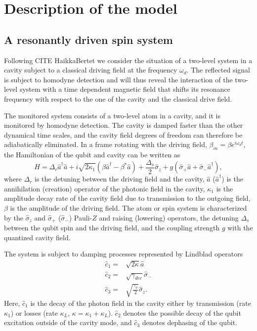 \documentclass[aps,pra,twocolumn,groupedaddress,showpacs]{revtex4}
\begin{document}
\section{Description of the model}

\subsection{A resonantly driven spin system}

Following CITE HaikkaBertet we consider the situation of a two-level system in a cavity subject to a classical driving field at the frequency $\omega_d$. The reflected signal is subject to homodyne detection and will thus reveal the interaction of the two-level system with a time dependent magnetic field that shifts its resonance frequency with respect to the one of the cavity and the classical drive field.   

The monitored system consists of a two-level atom in a cavity, and it is monitored by homodyne detection. The cavity is damped faster than the other dynamical time scales, and the cavity field degrees of freedom can therefore be adiabatically eliminated. In a frame rotating with the driving field, $\beta_{in} = \beta e^{i\omega_d t}$, the Hamiltonian of the qubit and cavity can be written as
\begin{equation}
H = \Delta_r \hat a^\dag \hat a + i \sqrt{2\kappa_1} (\beta \hat a^\dag - \beta ^* \hat a) + \frac{\Delta_s}{2} \hat \sigma_z + g(\hat \sigma_+ \hat a + \hat \sigma_- \hat a^\dag), \label{initial_Hamiltonian}
\end{equation}
where $\Delta_r$ is the detuning between the driving field and the cavity, $\hat a$ ($\hat a ^\dag$) is the annihilation (creation) operator of the photonic field in the cavity,
$\kappa_1$ is the amplitude decay rate of the cavity field due to transmission to the outgoing field, $\beta$ is the amplitude of the driving field. The atom or spin system is characterized by the $\hat \sigma_z$  and $\hat \sigma_+$ ($\hat \sigma_-$) Pauli-$Z$ and raising (lowering) operators, the detuning $\Delta_s$ between the qubit spin and the driving field, and the coupling strength $g$ with the quantized cavity field.

The system is subject to damping processes represented by Lindblad operators 
\begin{align}
\hat c_1 =& \sqrt{2\kappa} \hat a \\
\hat c_2 =& \sqrt{\gamma_{dec}} \hat \sigma_- \label{c2}\\
\hat c_3 =& \sqrt{\frac{\gamma_\phi}{2}} \hat \sigma_z. \label{c3}
\end{align}
Here, $\hat c_1$ is the decay of the photon field in the cavity either by transmission (rate $\kappa_1$) or losses (rate $\kappa_L$, $\kappa=\kappa_1+\kappa_L$). $\hat c_2$ denotes the possible decay of the qubit excitation outside of the cavity mode, and $\hat c_3$ denotes dephasing of the qubit.
\end{document}
